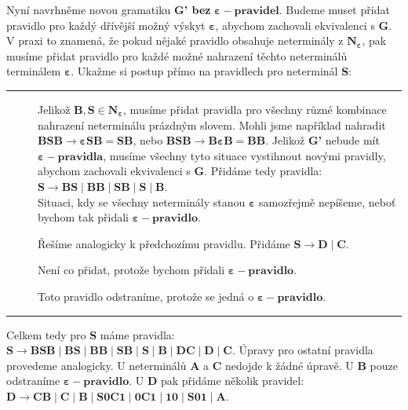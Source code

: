\documentclass{report}
\begin{document}
Nyní navrhněme novou gramatiku \textbf{G' bez }$\mathbf{\varepsilon-pravidel}$. Budeme muset přidat pravidlo pro každý dřívější možný výskyt $\mathbf{\varepsilon}$, abychom zachovali ekvivalenci s \textbf{G}. V praxi to znamená, že pokud nějaké pravidlo obsahuje neterminály z $\mathbf{N_{\varepsilon}}$, pak musíme přidat pravidlo pro každé možné nahrazení těchto neterminálů terminálem $\mathbf{\varepsilon}$. Ukažme si postup přímo na pravidlech pro neterminál \textbf{S}:
\vspace{0.4cm}    
\hrule
\vspace{0.1cm}
\begin{description}
    \item[] Jelikož $\mathbf{B,S \in N_{\varepsilon}}$, musíme přidat pravidla pro všechny různé kombinace nahrazení neterminálu prázdným slovem. Mohli jsme například nahradit $\mathbf{BSB \rightarrow \varepsilon{SB} = SB}$, nebo  $\mathbf{BSB \rightarrow B\varepsilon{B} = BB}$. Jelikož \textbf{G'} nebude mít $\mathbf{\varepsilon-pravidla}$, musíme všechny tyto situace vystihnout novými pravidly, abychom zachovali ekvivalenci s \textbf{G}. Přidáme tedy pravidla:\\$\mathbf{S \rightarrow BS \mid BB \mid SB \mid S \mid B}$.\\Situaci, kdy se všechny neterminály stanou $\mathbf{\varepsilon}$ samozřejmě nepíšeme, neboť bychom tak přidali $\mathbf{\varepsilon-pravidlo}$.
     \item[] Řešíme analogicky k předchozímu pravidlu. Přidáme $\mathbf{S \rightarrow D \mid C}$.
     \item[] Není co přidat, protože bychom přidali $\mathbf{\varepsilon-pravidlo}$.
      \item[] Toto pravidlo odstraníme, protože se jedná o $\mathbf{\varepsilon-pravidlo}$.  
\end{description}
\vspace{0.1cm}    
\hrule
\vspace{0.4cm}
Celkem tedy pro \textbf{S} máme pravidla: $\mathbf{S \rightarrow BSB \mid BS \mid BB \mid SB \mid S \mid B \mid DC \mid D \mid C}$. Úpravy pro ostatní pravidla provedeme analogicky. U neterminálů \textbf{A} a \textbf{C} nedojde k žádné úpravě. U \textbf{B} pouze odstraníme $\mathbf{\varepsilon-pravidlo}$. U \textbf{D} pak přidáme několik pravidel: $\mathbf{D \rightarrow CB \mid C \mid B \mid S0C1 \mid 0C1 \mid 10 \mid S01 \mid A}$.\\ \\
\end{document}
